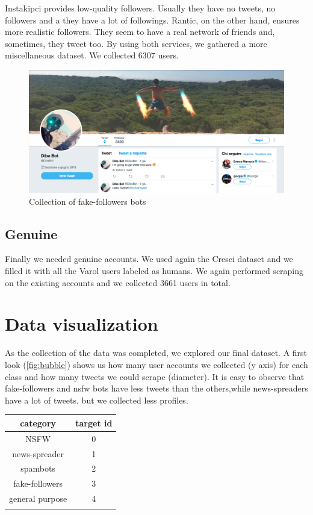 Instakipci provides low-quality followers. Usually they have no tweets, no followers and a they have a lot of followings.
Rantic, on the other hand, ensures more realistic followers. They seem to have a real network of friends and, sometimes, they tweet too.
By using both services, we gathered a more miscellaneous dataset.
We collected 6307 users.
\begin{figure}
	\centering
	\includegraphics[width=\columnwidth]{chapter3/figure/dibebot.png}
	\caption{Collection of fake-followers bots}
	\label{fig:dibebot}
\end{figure}

\subsection{Genuine}
Finally we needed genuine accounts. We used again the Cresci dataset \cite{Cresci} and we filled it with all the Varol users labeled as humans. We again performed scraping on the existing accounts and we collected 3661 users in total.

\newpage

\section{Data visualization}
As the collection of the data was completed, we explored our final dataset.
A first look (\ref{fig:bubble}) shows us how many user accounts we collected (y axis) for each class and how many tweets we could scrape (diameter). It is easy to observe that fake-followers and nsfw bots have less tweets than the others,while news-spreaders have a lot of tweets, but we collected less profiles.
\begin{center}
	\begin{tabular}{cc}
		\\category&target id\\
		\hline\hline
		NSFW&0\\
		news-spreader&1\\
		spambots&2\\
		fake-followers&3\\
		general purpose&4\\\hline\\		
	\end{tabular}
\end{center}



